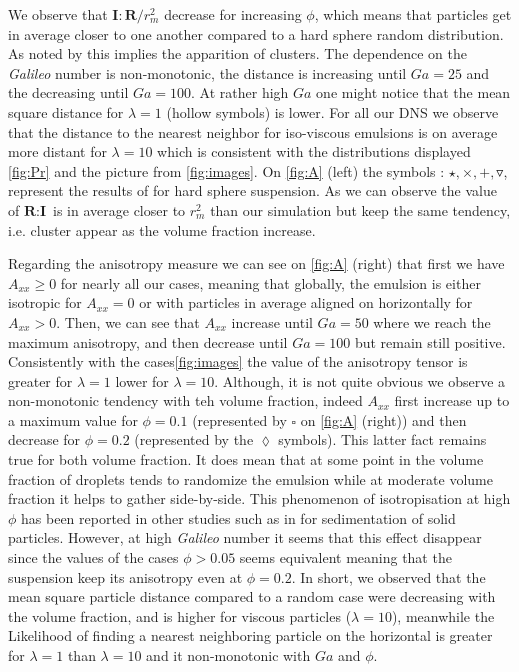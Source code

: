 We observe that $\textbf{I}:\textbf{R}/r_m^2$  decrease for increasing $\phi$, which means that particles get in average closer to one another compared to a hard sphere random distribution. 
As noted by \citet{zhang2023evolution} this implies the apparition of clusters. 
The dependence on the \textit{Galileo} number is non-monotonic, the distance is increasing until $Ga = 25$ and the decreasing until $Ga = 100$.  
At rather high $Ga$ one might notice that the mean square distance for $\lambda = 1$ (hollow symbols) is lower. 
For all our DNS we observe that the distance to the nearest neighbor for iso-viscous emulsions is on average more distant for $\lambda = 10$ which is consistent with the distributions displayed \ref{fig:Pr} and the picture from \ref{fig:images}.  
On \ref{fig:A} (left) the symbols : $\pmb\star, \pmb\times,\pmb +, \pmb\triangledown$, represent the results of \citet{zhang2023evolution} for hard sphere suspension. 
As we can observe the value of $\textbf{R}:\textbf{I}$ is in average closer to $r_m^2$ than our simulation but keep the same tendency, i.e. cluster appear as the volume fraction increase. 
 
Regarding the anisotropy measure we can see on \ref{fig:A} (right) that first we have $A_{xx} \ge 0$ for nearly all our cases, meaning that globally, the emulsion is either isotropic for $A_{xx} = 0$ or with particles in average aligned on horizontally for $A_{xx} >0$. 
Then, we can see that $A_{xx}$ increase until $Ga = 50$ where we reach the maximum anisotropy, and then decrease until $Ga =100$  but remain still positive. 
Consistently with the cases\ref{fig:images} the value of the anisotropy tensor is greater for $\lambda = 1$ lower for  $\lambda = 10$.
Although, it is not quite obvious we observe a non-monotonic tendency with teh volume fraction, indeed $A_{xx}$ first increase up to a maximum value for $\phi =0.1$ (represented by \textcolor{col3}{$\pmb\square$} on \ref{fig:A} (right)) and then decrease for $\phi=0.2$ (represented by the \textcolor{col3}{$\pmb\lozenge$} symbols). 
This latter fact remains true for both volume fraction. 
It does mean that at some point in the volume fraction of droplets tends to randomize the emulsion while at moderate volume fraction it helps to gather side-by-side. 
This phenomenon of isotropisation at high $\phi$ has been reported in other studies such as in \citet{seyed2021sedimentation} for sedimentation of solid particles. 
However, at high \textit{Galileo} number it seems that this effect disappear since the values of the cases $\phi>0.05$ seems equivalent meaning that the suspension keep its anisotropy even at $\phi=0.2$. 
In short, we observed that the mean square particle distance compared to a random case were decreasing with the volume fraction, and is higher for viscous particles ($\lambda = 10$), meanwhile the Likelihood of finding a nearest neighboring particle on the horizontal is greater for $\lambda=1$ than $\lambda = 10$ and it non-monotonic with $Ga$ and $\phi$. 


